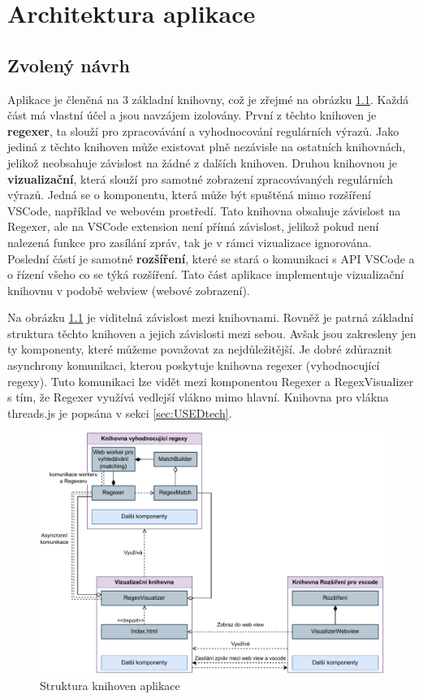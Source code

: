 \chapter{Architektura aplikace}\label{sec:ApplicationTechnology}

\section{Zvolený návrh}

Aplikace je členěná na 3 základní knihovny, což je zřejmé na obrázku \ref{fig:ARCH}.
Každá část má vlastní účel a jsou navzájem izolovány.
První z těchto knihoven je \textbf{regexer}, ta slouží pro zpracovávání a vyhodnocování regulárních výrazů.
Jako jediná z těchto knihoven může existovat plně nezávisle na ostatních knihovnách, jelikož neobsahuje závislost na žádné z dalších knihoven.
Druhou knihovnou je \textbf{vizualizační}, která slouží pro samotné zobrazení zpracovávaných regulárních výrazů.
Jedná se o komponentu, která může být spuštěná mimo rozšíření VSCode, například ve webovém prostředí.
Tato knihovna obsahuje závislost na Regexer, ale na VSCode extension není přímá závislost, jelikož pokud není nalezená funkce pro zasílání zpráv, tak je v rámci vizualizace ignorována.
Poslední částí je samotné \textbf{rozšíření}, které se stará o komunikaci s API VSCode a o řízení všeho co se týká rozšíření.
Tato část aplikace implementuje vizualizační knihovnu v podobě webview (webové zobrazení).

Na obrázku \ref{fig:ARCH} je viditelná závislost mezi knihovnami. 
Rovněž je patrná základní struktura těchto knihoven a jejich závislosti mezi sebou.
Avšak jsou zakresleny jen ty komponenty, které můžeme považovat za nejdůležitější. 
Je dobré zdůraznit asynchrony komunikaci, kterou poskytuje knihovna regexer (vyhodnocující regexy).
Tuto komunikaci lze vidět mezi komponentou Regexer a RegexVisualizer s tím, že Regexer využívá vedlejší vlákno mimo hlavní. 
Knihovna pro vlákna threads.js je popsána v sekci \ref{sec:USEDtech}.

\begin{figure}[!h]
	\centering
	\includegraphics[width=.9\textwidth]{Figures/BP-Arch.pdf}
	\caption{Struktura knihoven aplikace}
	\label{fig:ARCH}
\end{figure}

